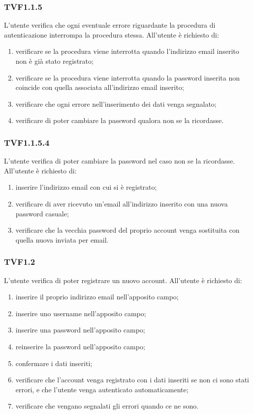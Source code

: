 		\subsubsection{TVF1.1.5}
			L'utente verifica che ogni eventuale errore riguardante la procedura di autenticazione interrompa la procedura stessa.
			All'utente è richiesto di:
			\begin{enumerate}
				\item verificare se la procedura viene interrotta quando l'indirizzo email inserito non è già stato registrato;
				\item verificare se la procedura viene interrotta quando la password inserita non coincide con quella associata all'indirizzo email inserito;
				\item verificare che ogni errore nell'inserimento dei dati venga segnalato;
				\item verificare di poter cambiare la password qualora non se la ricordasse. 
			\end{enumerate}
		\subsubsection{TVF1.1.5.4}
			L'utente verifica di poter cambiare la password nel caso non se la ricordasse.
			All'utente è richiesto di:
			\begin{enumerate}
				\item inserire l'indirizzo email con cui si è registrato;
				\item verificare di aver ricevuto un'email all'indirizzo inserito con una nuova password casuale;
				\item verificare che la vecchia password del proprio account venga sostituita con quella nuova inviata per email. 
			\end{enumerate}
		\subsubsection{TVF1.2}
			L'utente verifica di poter registrare un nuovo account.
			All'utente è richiesto di:
			\begin{enumerate}
				\item inserire il proprio indirizzo email nell'apposito campo;
				\item inserire uno username nell'apposito campo;
				\item inserire una password nell'apposito campo;
				\item reinserire la password nell'apposito campo;
				\item confermare i dati inseriti;
				\item verificare che l'account venga registrato con i dati inseriti se non ci sono stati errori, e che l'utente venga autenticato automaticamente;
				\item verificare che vengano segnalati gli errori quando ce ne sono.
			\end{enumerate}
